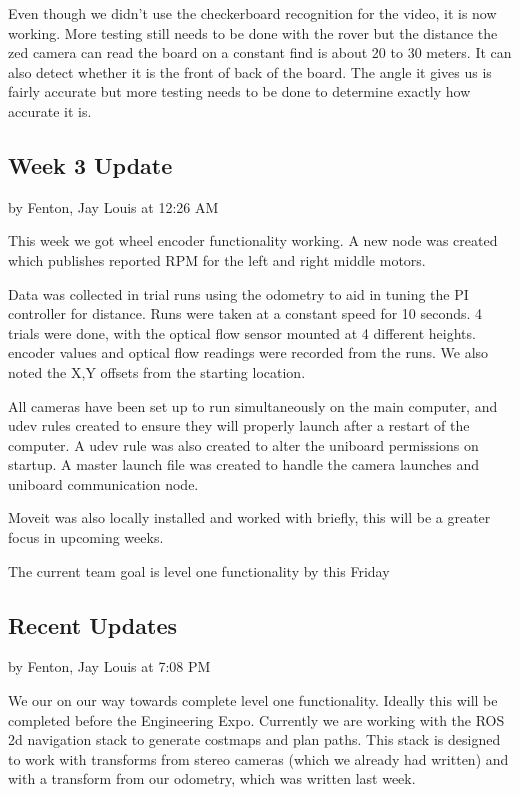 \documentclass[10pt, oneside,onecolumn]{IEEEtran}
\begin{document}
\begin{titlepage}
Even though we didn't use the checkerboard recognition for the video, it is now working. More testing still needs to be done with the rover but the distance the zed camera can read the board on a constant find is about 20 to 30 meters. It can also detect whether it is the front of back of the board. The angle it gives us is fairly accurate but more testing needs to be done to determine exactly how accurate it is.

\subsection{Week 3 Update}
by Fenton, Jay Louis at 12:26 AM

This week we got wheel encoder functionality working. A new node was created which publishes reported RPM for the left and right middle motors. 

Data was collected in trial runs using the odometry to aid in tuning the PI controller for distance. Runs were taken at a constant speed for 10 seconds. 4 trials were done, with the optical flow sensor mounted at 4 different heights. encoder values and optical flow readings were recorded from the runs. We also noted the X,Y offsets from the starting location.  

All cameras have been set up to run simultaneously on the main computer, and udev rules created to ensure they will properly launch after a restart of the computer. A udev rule was also created to alter the uniboard permissions on startup. A master launch file was created to handle the camera launches and uniboard communication node. 

Moveit was also locally installed and worked with briefly, this will be a greater focus in upcoming weeks. 

The current team goal is level one functionality by this Friday

\subsection{Recent Updates}
by Fenton, Jay Louis at 7:08 PM

We our on our way towards complete level one functionality. Ideally this will be completed before the Engineering Expo. Currently we are working with the ROS 2d navigation stack to generate costmaps and plan paths. This stack is designed to work with transforms from stereo cameras (which we already had written) and with a transform from our odometry, which was written last week. 


\end{titlepage}
\end{document}
